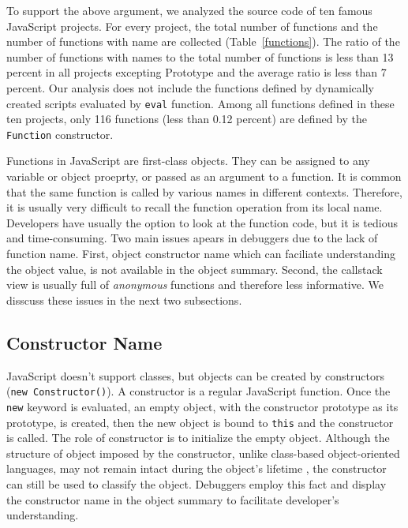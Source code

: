 \documentclass{acm_proc_article-sp}
\begin{document}
To support the above argument, we analyzed the source code of ten famous JavaScript projects. For every project, the total number of functions and the number of functions with name are collected (Table~\ref{functions}). The ratio of the number of functions with names to the total number of functions is less than 13 percent in all projects excepting Prototype and the average ratio is less than 7 percent. Our analysis does not include the functions defined by dynamically created scripts evaluated by {\small\texttt{eval}} function. Among all functions defined in these ten projects, only 116 functions (less than 0.12 percent) are defined by the {\small\texttt{Function}} constructor. 

Functions in JavaScript are first-class objects. They can be assigned to any variable or object proeprty, or passed as an argument to a function. It is common that the same function is called by various names in different contexts. Therefore, it is usually very difficult to recall the function operation from its local name. Developers have usually the option to look at the function code, but it is tedious and time-consuming. Two main issues apears in debuggers due to the lack of function name. First, object constructor name which can faciliate understanding the object value, is not available in the object summary. Second, the callstack view is usually full of \textit{anonymous} functions and therefore less informative. We disscuss these issues in the next two subsections.
 

\subsection{Constructor Name}
JavaScript doesn't support classes, but objects can be created by constructors ({\small\texttt{new Constructor()}}). A constructor is a regular JavaScript function. Once the {\small\texttt{new}} keyword is evaluated, an empty object, with the constructor prototype as its prototype, is created, then the new object is bound to {\small\texttt{this}} and the constructor is called. The role of constructor is to initialize the empty object. Although the structure of object imposed by the constructor, unlike class-based object-oriented languages, may not remain intact during the object's lifetime \cite{Richards}, the constructor can still be used to classify the object. 
Debuggers employ this fact and display the constructor name in the object summary to facilitate developer's understanding. 
\end{document}
